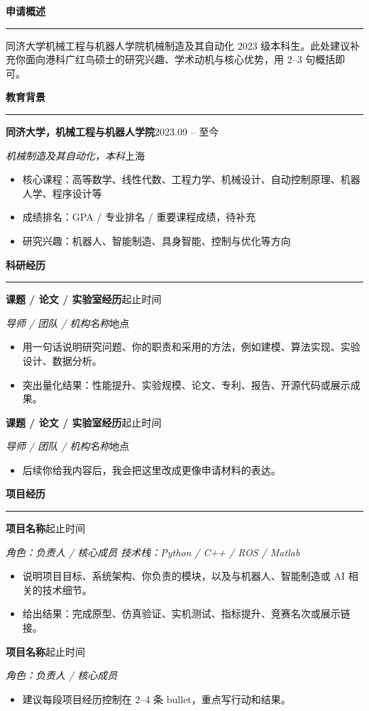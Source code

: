 \documentclass[10pt,a4paper]{article}
\newcommand{\sectionline}{\vspace{-0.55em}\color{rulegray}\rule{\linewidth}{0.8pt}\vspace{0.35em}}
\newcommand{\cvsection}[1]{%
  \vspace{0.55em}%
  {\Large\bfseries\color{accent}#1}\par
  \sectionline
}
\newcommand{\job}[4]{%
  \textbf{#1}\hfill \textcolor{textgray}{#2}\par
  \textit{#3}\hfill \textcolor{textgray}{#4}\par
}
\begin{document}
\begin{minipage}[t]{0.72\textwidth}
\vspace{0pt}

\cvsection{申请概述}
\textcolor{textgray}{同济大学机械工程与机器人学院机械制造及其自动化 2023 级本科生。此处建议补充你面向港科广红鸟硕士的研究兴趣、学术动机与核心优势，用 2--3 句概括即可。}

\cvsection{教育背景}
\job{同济大学，机械工程与机器人学院}{2023.09 -- 至今}{机械制造及其自动化，本科}{上海}
\begin{itemize}
  \item 核心课程：高等数学、线性代数、工程力学、机械设计、自动控制原理、机器人学、程序设计等
  \item 成绩排名：GPA / 专业排名 / 重要课程成绩，待补充
  \item 研究兴趣：机器人、智能制造、具身智能、控制与优化等方向
\end{itemize}

\cvsection{科研经历}
\job{课题 / 论文 / 实验室经历}{起止时间}{导师 / 团队 / 机构名称}{地点}
\begin{itemize}
  \item 用一句话说明研究问题、你的职责和采用的方法，例如建模、算法实现、实验设计、数据分析。
  \item 突出量化结果：性能提升、实验规模、论文、专利、报告、开源代码或展示成果。
\end{itemize}

\job{课题 / 论文 / 实验室经历}{起止时间}{导师 / 团队 / 机构名称}{地点}
\begin{itemize}
  \item 后续你给我内容后，我会把这里改成更像申请材料的表达。
\end{itemize}

\cvsection{项目经历}
\job{项目名称}{起止时间}{角色：负责人 / 核心成员 \quad 技术栈：Python / C++ / ROS / Matlab}{}
\begin{itemize}
  \item 说明项目目标、系统架构、你负责的模块，以及与机器人、智能制造或 AI 相关的技术细节。
  \item 给出结果：完成原型、仿真验证、实机测试、指标提升、竞赛名次或展示链接。
\end{itemize}

\job{项目名称}{起止时间}{角色：负责人 / 核心成员}{}
\begin{itemize}
  \item 建议每段项目经历控制在 2--4 条 bullet，重点写行动和结果。
\end{itemize}


\end{minipage}
\end{document}

